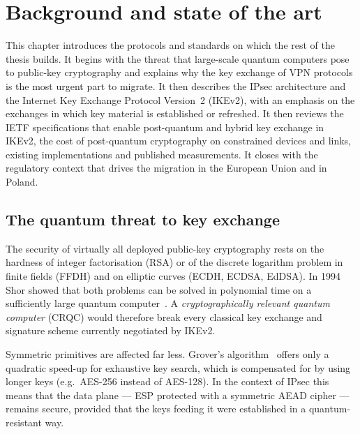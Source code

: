 \clearpage
\section{Background and state of the art}
\label{sec:sota}

This chapter introduces the protocols and standards on which the rest of the
thesis builds. It begins with the threat that large-scale quantum computers
pose to public-key cryptography and explains why the key exchange of VPN
protocols is the most urgent part to migrate. It then describes the IPsec
architecture and the Internet Key Exchange Protocol Version~2 (IKEv2), with an
emphasis on the exchanges in which key material is established or refreshed.
It then reviews the IETF specifications that enable post-quantum and
hybrid key exchange in IKEv2, the cost of post-quantum cryptography on
constrained devices and links, existing implementations and published
measurements. It closes with the regulatory context that drives the migration
in the European Union and in Poland.

\subsection{The quantum threat to key exchange}
\label{sec:sota-quantum}

The security of virtually all deployed public-key cryptography rests on the
hardness of integer factorisation (RSA) or of the discrete logarithm problem in
finite fields (FFDH) and on elliptic curves (ECDH, ECDSA, EdDSA). In 1994 Shor
showed that both problems can be solved in polynomial time on a sufficiently
large quantum computer~\cite{shor1997}. A \emph{cryptographically relevant
quantum computer} (CRQC) would therefore break every classical key exchange and
signature scheme currently negotiated by IKEv2.

Symmetric primitives are affected far less. Grover's algorithm~\cite{grover1996}
offers only a quadratic speed-up for exhaustive key search, which is
compensated for by using longer keys (e.g.\ AES-256 instead of AES-128). In the
context of IPsec this means that the data plane --- ESP protected with a
symmetric AEAD cipher --- remains secure, provided that the keys feeding it were
established in a quantum-resistant way.

